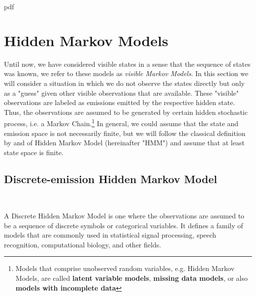 

\if pdf
    \graphicspath{{Chapter4/Figs/Raster/}{Chapter4/Figs/PDF/}{Chapter4/Figs/}}
\else
    \graphicspath{{Chapter4/Figs/Vector/}{Chapter4/Figs/}}
\fi

\chapter{Hidden Markov Models}

Until now, we have considered visible states in a sense that the sequence of states was known, we refer to these models as \textit{visible Markov Models}.
In this section we will consider a situation in which we do not observe the states directly but only as a "guess" given other visible observations that are available. 
These "visible" observations are labeled as emissions emitted by the respective hidden state. Thus, the observations are assumed to be generated by certain hidden stochastic process, i.e. a Markov Chain.\footnote{Models that
comprise unobserved random variables, e.g. Hidden Markov Models, are called \textbf{latent variable models}, \textbf{missing data models}, or also \textbf{models with incomplete data}}
In general, we could assume that the state and emission space is not necessarily finite, but we will follow the classical definition by \citep{Rabiner1989} and \citep{Elliott1995} of Hidden Markov Model (hereinafter "HMM") and assume that at least state space is finite.

\section{Discrete-emission Hidden Markov Model}~\label{sec:discrete_hmm}

A Discrete Hidden Markov Model is one where the observations are assumed to be a sequence of discrete symbols or categorical variables. It defines a family of models that are
commonly used in statistical signal processing, speech recognition, computational biology, and other fields. \citep{Rabiner1989}


